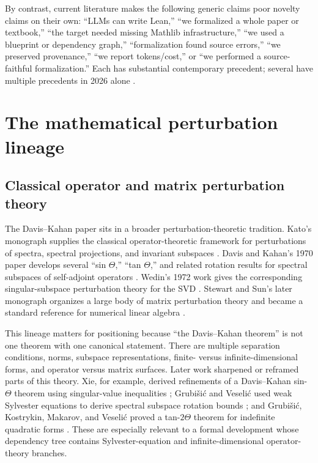 \documentclass[11pt]{article}
\begin{document}
By contrast, current literature makes the following generic claims poor novelty
claims on their own: ``LLMs can write Lean,'' ``we formalized a whole paper or
textbook,'' ``the target needed missing Mathlib infrastructure,'' ``we used a
blueprint or dependency graph,'' ``formalization found source errors,'' ``we
preserved provenance,'' ``we report tokens/cost,'' or ``we performed a
source-faithful formalization.''  Each has substantial contemporary precedent;
several have multiple precedents in 2026 alone
\citep{milikic2026leanflow,nie2026formatheoria,zhang2026slt,wei2026asymptotic}.

\section{The mathematical perturbation lineage}
\label{sec:math-lineage}

\subsection{Classical operator and matrix perturbation theory}

The Davis--Kahan paper sits in a broader perturbation-theoretic tradition.
Kato's monograph supplies the classical operator-theoretic framework for
perturbations of spectra, spectral projections, and invariant subspaces
\citep{kato1976perturbation}.  Davis and Kahan's 1970 paper develops several
``sin $\Theta$,'' ``tan $\Theta$,'' and related rotation results for spectral
subspaces of self-adjoint operators \citep{davis1970rotation}.  Wedin's 1972
work gives the corresponding singular-subspace perturbation theory for the SVD
\citep{wedin1972perturbation}.  Stewart and Sun's later monograph organizes a
large body of matrix perturbation theory and became a standard reference for
numerical linear algebra \citep{stewart1990matrix}.

This lineage matters for positioning because ``the Davis--Kahan theorem'' is not
one theorem with one canonical statement.  There are multiple separation
conditions, norms, subspace representations, finite- versus infinite-dimensional
forms, and operator versus matrix surfaces.  Later work sharpened or reframed
parts of this theory.  Xie, for example, derived refinements of a Davis--Kahan
sin-$\Theta$ theorem using singular-value inequalities \citep{xie1997note};
Grubi\v{s}i\'c and Veseli\'c used weak Sylvester equations to derive spectral
subspace rotation bounds \citep{grubisic2005sylvester}; and Grubi\v{s}i\'c,
Kostrykin, Makarov, and Veseli\'c proved a tan-$2\Theta$ theorem for indefinite
quadratic forms \citep{grubisic2010tan}.  These are especially relevant to a
formal development whose dependency tree contains Sylvester-equation and
infinite-dimensional operator-theory branches.
\end{document}

